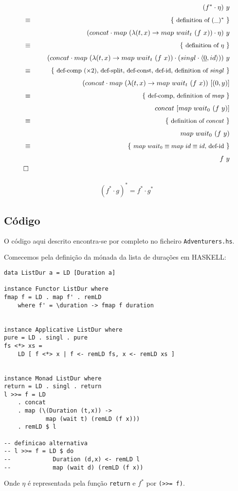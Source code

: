 \documentclass[12pt]{extarticle}
\def\comp{\mathbin{\cdot}}
\def\start{&&}
\def\qed{\\&\Box&}
\def\just#1#2{\\ &#1& \rule{2em}{0pt} \{ \mbox{\rule[-.7em]{0pt}{1.8em} \small #2 \/} \} \nonumber\\ && }
\begin{document}
\begin{eqnarray*}
    \start
        (f^* \comp \eta)\ y
    \just\equiv{ definition of $(\_)^*$ }
        (concat \comp map\ (\lambda (t,x) \rightarrow map\ wait_t\ (f\ x)) \comp \eta)\ y
    \just\equiv{ definition of $\eta$ }
        (concat \comp map\ (\lambda (t,x) \rightarrow map\ wait_t\ (f\ x)) \comp (singl \comp \langle \underline{0}, id \rangle))\ y
    \just\equiv{ def-comp ($\times 2$), def-split, def-const, def-id, definition of $singl$ }
        (concat \comp map\ (\lambda (t,x) \rightarrow map\ wait_t\ (f\ x))\ [(0,y)]
    \just\equiv{ def-comp, definition of $map$}
        concat\ [map\ wait_0\ (f\ y)]
    \just\equiv{ definition of $concat$ }
        map\ wait_0\ (f\ y)
    \just\equiv{ $map\ wait_0 \equiv map\ id \equiv id$, def-id }
        f\ y
    \qed
\end{eqnarray*}

\begin{eqnarray*}
    (f^* \comp g)^* = f^* \comp g^*
\end{eqnarray*}


\subsection{Código}
O código aqui descrito encontra-se por completo no ficheiro \texttt{Adventurers.hs}.

Comecemos pela definição da mónada da lista de durações em HASKELL:
\begin{lstlisting}
data ListDur a = LD [Duration a]

instance Functor ListDur where
fmap f = LD . map f' . remLD
    where f' = \duration -> fmap f duration


instance Applicative ListDur where
pure = LD . singl . pure
fs <*> xs = 
    LD [ f <*> x | f <- remLD fs, x <- remLD xs ]


instance Monad ListDur where
return = LD . singl . return
l >>= f = LD 
    . concat 
    . map (\(Duration (t,x)) -> 
            map (wait t) (remLD (f x)))
    . remLD $ l

-- definicao alternativa
-- l >>= f = LD $ do 
--            Duration (d,x) <- remLD l
--            map (wait d) (remLD (f x))
\end{lstlisting}
Onde $\eta$ é representada pela função \texttt{return} e $f^*$ por \texttt{(>>= f)}.
\\\\
\end{document}
